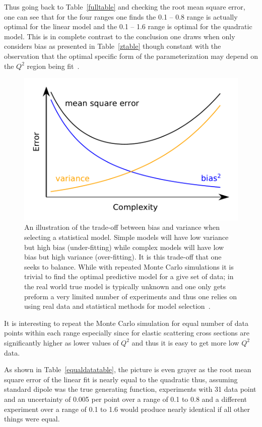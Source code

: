\documentclass[10pt,aps,prc,twocolumn]{revtex4-1}
\begin{document}
Thus going back to Table~\ref{fulltable} and checking the root mean square error, one can see that for the four ranges
one finds the 0.1 -- 0.8 range is actually optimal for the linear model and the 0.1 -- 1.6 range is optimal for the quadratic model. 
This is in complete contrast to the conclusion one draws when only considers bias as presented in Table~\ref{ztable}
though constant with the observation that the optimal specific form of the parameterization may depend on the $Q^2$ region
being fit~\cite{Alberico:2008sz}.
\begin{figure}
\includegraphics[width=\columnwidth]{Figure/biasvariance-clean.pdf}
\caption{An illustration of the trade-off between bias and variance when selecting a statistical model.   Simple models
will have low variance but high bias (under-fitting) while complex models will have low bias but high variance (over-fitting).   
It is this trade-off that one seeks to balance.   While with repeated  Monte Carlo simulations it is trivial to find the optimal
predictive model for a give set of data; in the real world true model is typically unknown and one only gets preform a very limited number
of experiments and thus one relies on using real data and statistical methods for model selection~\cite{Hastie:2009}.
}
\end{figure}

It is interesting to repeat the Monte Carlo simulation for equal number of data points within each range
especially since for elastic scattering cross sections are significantly higher as lower values of $Q^2$
and thus it is easy to get more low $Q^2$ data.

As shown in Table~\ref{equaldatatable}, the picture is even grayer as the root mean square error of the linear 
fit is nearly equal to the quadratic thus, assuming standard dipole was the true generating function,  experiments
with 31 data point and an uncertainty of 0.005 per point over a range of 0.1 to 0.8 and a different experiment
over a range of 0.1 to 1.6 would produce nearly identical if all other things were equal.
\end{document}
